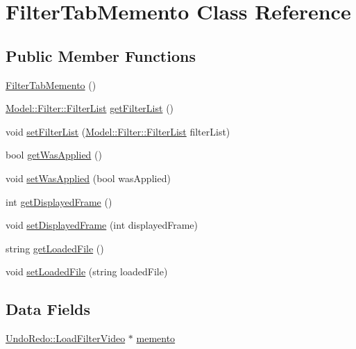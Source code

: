 \hypertarget{classMemento_1_1FilterTabMemento}{}\section{Filter\+Tab\+Memento Class Reference}
\label{classMemento_1_1FilterTabMemento}
\subsection*{Public Member Functions}
\begin{DoxyCompactItemize}
\item 
\hyperlink{classMemento_1_1FilterTabMemento_a84a5fcbb2f69b5b3c57dae3540fdd40b}{Filter\+Tab\+Memento} ()
\item 
\hyperlink{classModel_1_1Filter_1_1FilterList}{Model\+::\+Filter\+::\+Filter\+List} \hyperlink{classMemento_1_1FilterTabMemento_a8f68d1381e85b679f08fb6208565af24}{get\+Filter\+List} ()
\item 
void \hyperlink{classMemento_1_1FilterTabMemento_aa18e770b0715c18549678cb5241b8714}{set\+Filter\+List} (\hyperlink{classModel_1_1Filter_1_1FilterList}{Model\+::\+Filter\+::\+Filter\+List} filter\+List)
\item 
bool \hyperlink{classMemento_1_1FilterTabMemento_aece4e0d122e3afae0c4173edba6a4cc8}{get\+Was\+Applied} ()
\item 
void \hyperlink{classMemento_1_1FilterTabMemento_a635ac39ad3547885c6d8a5f631a86aeb}{set\+Was\+Applied} (bool was\+Applied)
\item 
int \hyperlink{classMemento_1_1FilterTabMemento_a116429d102ca02253915c78f76d305d2}{get\+Displayed\+Frame} ()
\item 
void \hyperlink{classMemento_1_1FilterTabMemento_ad3eeeb568c249bd940edc513b0697cd8}{set\+Displayed\+Frame} (int displayed\+Frame)
\item 
string \hyperlink{classMemento_1_1FilterTabMemento_aef6a8daef5ed9e5ac0862ef4323f3f8d}{get\+Loaded\+File} ()
\item 
void \hyperlink{classMemento_1_1FilterTabMemento_a2dc9fb31a997a0f4d76aa4b6d11c12c9}{set\+Loaded\+File} (string loaded\+File)
\end{DoxyCompactItemize}
\subsection*{Data Fields}
\begin{DoxyCompactItemize}
\item 
\hyperlink{classUndoRedo_1_1LoadFilterVideo}{Undo\+Redo\+::\+Load\+Filter\+Video} $\ast$ \hyperlink{classMemento_1_1FilterTabMemento_a716369548c922081dc92d740a92f6314}{memento}
\end{DoxyCompactItemize}


